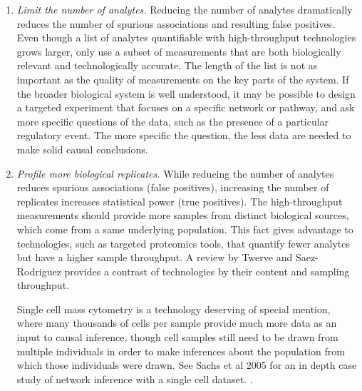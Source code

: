 \documentclass[journal=jacsat,manuscript=article]{achemso}
\def\added#1{{\color{blue} #1}}
\begin{document}
\begin{enumerate}
\item \textit{Limit the number of analytes.} \added{Reducing the number of analytes dramatically reduces the number of spurious associations and resulting false positives.} Even though a list of analytes quantifiable with high-throughput technologies grows larger, only use a subset of measurements that are both biologically relevant and technologically accurate. The length of the list is not as important as the quality of measurements on the key parts of the system.  If the broader biological system is well understood, it may be possible to design a targeted experiment that focuses on a specific network or pathway, and ask more specific questions of the data, such as the presence of a particular regulatory event.  The more specific the question, the less data are needed to make solid causal conclusions.  

\item \textit{Profile more biological replicates.}  \added{While reducing the number of analytes reduces spurious associations (false positives), increasing the number of replicates increases statistical power (true positives).}  The high-throughput measurements should provide more samples from distinct biological sources, which come from a same underlying population.  This fact gives advantage to technologies, such as targeted proteomics tools, that quantify fewer analytes but have a higher sample throughput.  \added{A review by Twerve and Saez-Rodriguez provides a contrast of technologies by their content and sampling throughput\cite{SaezRodriguez:2012kx}.} 

\added{Single cell mass cytometry is a technology deserving of special mention, where many thousands of cells per sample provide much more data as an input to causal inference, though cell samples still need to be drawn from multiple individuals in order to make inferences about the population from which those individuals were drawn}. See Sachs et al 2005 for an in depth case study of network inference with a single cell dataset. \cite{sachs2005causal}.  


\end{enumerate}
\end{document}
